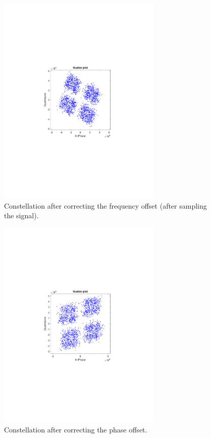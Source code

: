 \begin{refsection}
\begin{figure}[H]
	\centering
	\includegraphics[clip, trim=4cm 8cm 4cm 8cm, width=0.7\textwidth]{./sdf/m_qam_system/figures/exp/const-wvCorr-sps.pdf}
	\caption{Constellation after correcting the frequency offset (after sampling the signal).}
	\label{fig:rxWvCorrSamp}
\end{figure}

\begin{figure}[H]
	\centering
	\includegraphics[clip, trim=4cm 8cm 4cm 8cm, width=0.7\textwidth]{./sdf/m_qam_system/figures/exp/const-final-sps.pdf}
	\caption{Constellation after correcting the phase offset.}
	\label{fig:rxFinal}
\end{figure}


\end{refsection}
